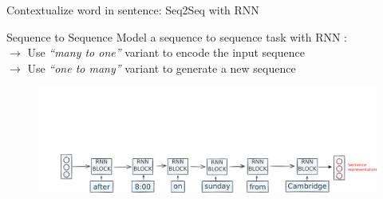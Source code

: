 \documentclass[10pt,aspectratio=169]{beamer}
\begin{document}
\begin{frame}{Contextualize word in sentence: Seq2Seq with RNN}

    \begin{block}{Sequence to Sequence}
      \vspace{.1cm}
      {\footnotesize
        Model a sequence to sequence task with RNN :\\ 
        $\rightarrow $ Use \textit{``many to one''} variant to encode the input sequence\\
        $\rightarrow $ Use \textit{``one to many''} variant to generate a new sequence\\
      } 
    \end{block}

    \begin{figure}
      \centering
      \includegraphics[width=1.\textwidth]{img/RNN-example-seq2seq-8.pdf}
    \end{figure}


  \end{frame}
\end{document}
